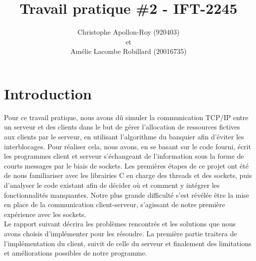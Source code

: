 \documentclass[11pt]{article}
\title{Travail pratique \#2 - IFT-2245}
\author{Christophe Apollon-Roy (920403) \\et \\Amélie Lacombe Robillard (20016735)}
\begin{document}
\maketitle
\section*{ Introduction }
\setlength{\parindent}{20pt}
Pour ce travail pratique, nous avons dû simuler la communication TCP/IP entre un serveur et des clients dans le but de gérer l'allocation 
de ressources fictives aux clients par le serveur, en utilisant l’algorithme du banquier afin d’éviter les interblocages.  Pour réaliser 
cela, nous avons, en se basant sur le code fourni, écrit les programmes client et serveur s'échangeant de l'information sous la forme de 
courts messages par le biais de sockets. Les premières étapes de ce projet ont été de nous familiariser avec les librairies C en charge des 
threads et des sockets, puis d’analyser le code existant afin de décider où et comment y intégrer les fonctionnalités manquantes. Notre plus 
grande difficulté s’est révélée être la mise en place de la communication client-serveur, s’agissant de notre première expérience avec les sockets.  
\\ 
Le rapport suivant décrira les problèmes rencontrés et les solutions que nous avons choisis d’implémenter pour les résoudre. La première partie
 traitera de l’implémentation du client, suivit de celle du serveur et finalement des limitations et améliorations possibles de notre programme. 
\\
\end{document}

